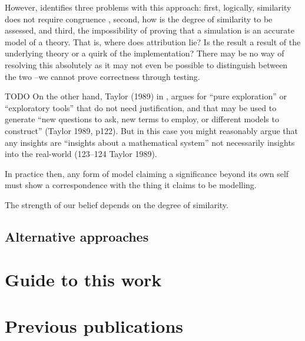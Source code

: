 However, \autocite{Eldridge} identifies three problems with this
approach: first, logically, similarity does not require congruence
\autocite{Weitzenfeld1984}, second, how is the degree of similarity to
be assessed, and third, the impossibility of proving that a simulation
is an accurate model of a theory. That is, where does attribution lie?
Is the result a result of the underlying theory or a quirk of the
implementation? There may be no way of resolving this absolutely as it
may not even be possible to distinguish between the two
\autocite{DiPaolo2000}--we cannot prove correctness through testing.

TODO On the other hand, Taylor (1989) in \autocite{Webb2009}, argues for
``pure exploration'' or ``exploratory tools'' that do not need
justification, and that may be used to generate ``new questions to ask,
new terms to employ, or different models to construct'' (Taylor 1989,
p122). But in this case you might reasonably argue that any insights are
``insights about a mathematical system'' not necessarily insights into
the real-world (123–124 Taylor 1989).

In practice then, any form of model claiming a significance beyond its
own self must show a correspondence with the thing it claims to be
modelling.

The strength of our belief depends on the degree of similarity.

\subsection{Alternative approaches}

\section{Guide to this work}\label{guide-to-this-work}

\section{Previous publications}\label{previous-publications}

